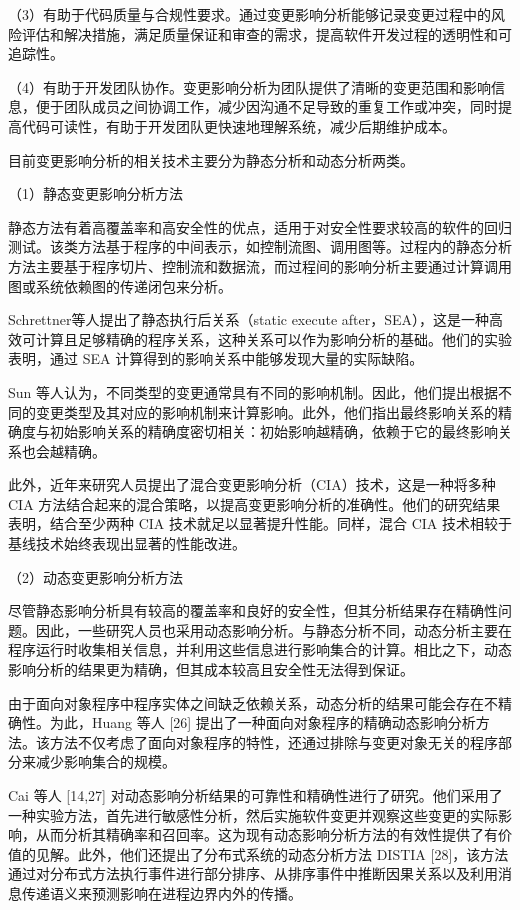 （3）有助于代码质量与合规性要求。通过变更影响分析能够记录变更过程中的风险评估和解决措施，满足质量保证和审查的需求，提高软件开发过程的透明性和可追踪性。

（4）有助于开发团队协作。变更影响分析为团队提供了清晰的变更范围和影响信息，便于团队成员之间协调工作，减少因沟通不足导致的重复工作或冲突，同时提高代码可读性，有助于开发团队更快速地理解系统，减少后期维护成本。

目前变更影响分析的相关技术主要分为静态分析和动态分析两类。

（1）静态变更影响分析方法

静态方法有着高覆盖率和高安全性的优点，适用于对安全性要求较高的软件的回归测试。该类方法基于程序的中间表示，如控制流图、调用图等。过程内的静态分析方法主要基于程序切片、控制流和数据流，而过程间的影响分析主要通过计算调用图或系统依赖图的传递闭包来分析。

Schrettner等人提出了静态执行后关系（static execute after，SEA），这是一种高效可计算且足够精确的程序关系，这种关系可以作为影响分析的基础。他们的实验表明，通过 SEA 计算得到的影响关系中能够发现大量的实际缺陷。

Sun 等人认为，不同类型的变更通常具有不同的影响机制。因此，他们提出根据不同的变更类型及其对应的影响机制来计算影响。此外，他们指出最终影响关系的精确度与初始影响关系的精确度密切相关：初始影响越精确，依赖于它的最终影响关系也会越精确。

此外，近年来研究人员提出了混合变更影响分析（CIA）技术，这是一种将多种 CIA 方法结合起来的混合策略，以提高变更影响分析的准确性。他们的研究结果表明，结合至少两种 CIA 技术就足以显著提升性能。同样，混合 CIA 技术相较于基线技术始终表现出显著的性能改进。

（2）动态变更影响分析方法

尽管静态影响分析具有较高的覆盖率和良好的安全性，但其分析结果存在精确性问题。因此，一些研究人员也采用动态影响分析。与静态分析不同，动态分析主要在程序运行时收集相关信息，并利用这些信息进行影响集合的计算。相比之下，动态影响分析的结果更为精确，但其成本较高且安全性无法得到保证。

由于面向对象程序中程序实体之间缺乏依赖关系，动态分析的结果可能会存在不精确性。为此，Huang 等人 [26] 提出了一种面向对象程序的精确动态影响分析方法。该方法不仅考虑了面向对象程序的特性，还通过排除与变更对象无关的程序部分来减少影响集合的规模。

Cai 等人 [14,27] 对动态影响分析结果的可靠性和精确性进行了研究。他们采用了一种实验方法，首先进行敏感性分析，然后实施软件变更并观察这些变更的实际影响，从而分析其精确率和召回率。这为现有动态影响分析方法的有效性提供了有价值的见解。此外，他们还提出了分布式系统的动态分析方法 DISTIA [28]，该方法通过对分布式方法执行事件进行部分排序、从排序事件中推断因果关系以及利用消息传递语义来预测影响在进程边界内外的传播。

